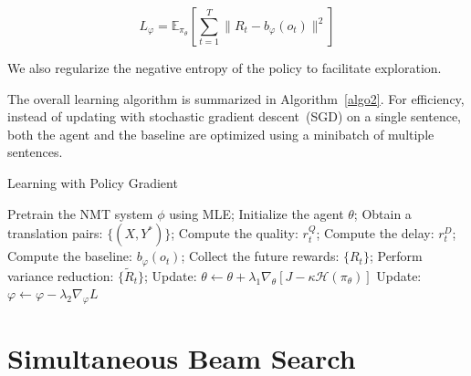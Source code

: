 \begin{equation}
    L_{\varphi} = \mathbb{E}_{\pi_{\theta}}\left[ \sum_{t=1}^T\|R_t - b_{\varphi}\left(o_t\right)\|^2 \right]
\end{equation}

We also regularize the negative entropy of  the policy 
to facilitate exploration. 

The overall learning algorithm is summarized in Algorithm~\ref{algo2}. For efficiency, instead of updating with stochastic gradient descent~(SGD) on a single sentence, both the agent and the baseline are optimized using 
a minibatch of multiple sentences.

\begin{algorithm}[t]
\caption{Learning with Policy Gradient}
\label{algo2}
\begin{algorithmic}[1]
{}
\State Pretrain the NMT system $\phi$ using MLE;
\State Initialize the agent $\theta$;
\State Obtain a translation pairs: $\{(X, Y^*)\}$;
\State Compute the quality: $r_t^Q$;
\State Compute the delay: $r_t^D$;
\State Compute the baseline: $b_{\varphi}\left(o_t\right)$;
\EndFor
\EndFor
\State Collect the future rewards: $\{R_t\}$;
\State Perform variance reduction: $\{\tilde{R}_t\}$;
\State Update: $\theta \gets \theta + \lambda_1 \nabla_{\theta}\left[J - \kappa\mathcal{H}(\pi_{\theta})\right]$
\State Update: $\varphi \gets \varphi - \lambda_2 \nabla_{\varphi}L$
\EndWhile
\end{algorithmic}
\end{algorithm}


\section{Simultaneous Beam Search}
\label{sec:beamsearch}

